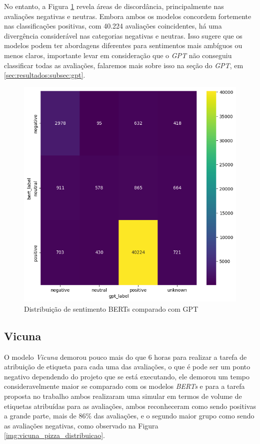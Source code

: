 No entanto, a Figura \ref{img:heat_bert_vs_gpt} revela áreas de discordância, principalmente nas avaliações negativas e neutras. Embora ambos os modelos concordem fortemente nas classificações positivas, com 40.224 avaliações coincidentes, há uma divergência considerável nas categorias negativas e neutras. Isso sugere que os modelos podem ter abordagens diferentes para sentimentos mais ambíguos ou menos claros, importante levar em consideração que o \textit{GPT} não conseguiu classificar todas as avaliações, falaremos mais sobre isso na seção do \textit{GPT}, em \ref{sec:resultados:subsec:gpt}.

\begin{figure}
	\centering
	\includegraphics[width=.8\textwidth]{figs/bert/heat_vs_gpt.png}
	\caption{Distribuição de sentimento BERTs comparado com GPT}
	\label{img:heat_bert_vs_gpt}
\end{figure}


\subsection{Vicuna}
\label{sec:resultados:subsec:vicuna}


O modelo \textit{Vicuna} demorou pouco mais do que 6 horas para realizar a tarefa de atribuição de etiqueta para cada uma das avaliações, o que é pode ser um ponto negativo dependendo do projeto que se está executando, ele demorou um tempo consideravelmente maior se comparado com os modelos \textit{BERTs} e para a tarefa proposta no trabalho ambos realizaram uma simular em termos de volume de etiquetas atribuídas para as avaliações, ambos reconheceram como sendo positivas a grande parte, mais de 86\% das avaliações, e o segundo maior grupo como sendo as avaliações negativas, como observado na Figura \ref{img:vicuna_pizza_distribuicao}.

